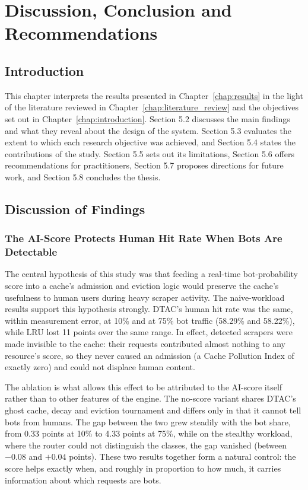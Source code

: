 \chapter{Discussion, Conclusion and Recommendations}
\label{chap:discussion}

\section{Introduction}
This chapter interprets the results presented in Chapter~\ref{chap:results} in the light of the literature reviewed in Chapter~\ref{chap:literature_review} and the objectives set out in Chapter~\ref{chap:introduction}. Section 5.2 discusses the main findings and what they reveal about the design of the system. Section 5.3 evaluates the extent to which each research objective was achieved, and Section 5.4 states the contributions of the study. Section 5.5 sets out its limitations, Section 5.6 offers recommendations for practitioners, Section 5.7 proposes directions for future work, and Section 5.8 concludes the thesis.

\section{Discussion of Findings}

\subsection{The AI-Score Protects Human Hit Rate When Bots Are Detectable}
The central hypothesis of this study was that feeding a real-time bot-probability score into a cache's admission and eviction logic would preserve the cache's usefulness to human users during heavy scraper activity. The naive-workload results support this hypothesis strongly. DTAC's human hit rate was the same, within measurement error, at 10\% and at 75\% bot traffic (58.29\% and 58.22\%), while LRU lost 11 points over the same range. In effect, detected scrapers were made invisible to the cache: their requests contributed almost nothing to any resource's score, so they never caused an admission (a Cache Pollution Index of exactly zero) and could not displace human content.

The ablation is what allows this effect to be attributed to the AI-score itself rather than to other features of the engine. The no-score variant shares DTAC's ghost cache, decay and eviction tournament and differs only in that it cannot tell bots from humans. The gap between the two grew steadily with the bot share, from 0.33 points at 10\% to 4.33 points at 75\%, while on the stealthy workload, where the router could not distinguish the classes, the gap vanished (between $-0.08$ and $+0.04$ points). These two results together form a natural control: the score helps exactly when, and roughly in proportion to how much, it carries information about which requests are bots.

